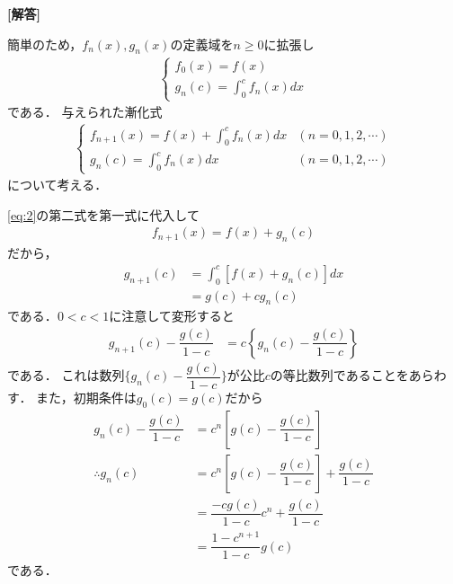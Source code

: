 \documentclass[../../main.tex]{subfiles}
\begin{document}
\begin{oframed}
  
\end{oframed}

{\bf [解答]}

簡単のため，$f_n(x),g_n(x)$の定義域を$n\ge 0$に拡張し
\begin{align}
  \begin{cases}
    f_{0}(x) = f(x) \\
    g_{n}(c) = \int_{0}^{c} f_n(x) dx
  \end{cases} \label{eq:1}
\end{align}
である．
与えられた漸化式
\begin{align}
  \begin{cases}
    f_{n+1}(x) = f(x) + \int_{0}^{c} f_{n}(x) dx & \left(n=0,1,2,\cdots \right)\\
    g_{n}(c) = \int_{0}^{c} f_{n}(x) dx & \left(n=0,1,2,\cdots \right)
  \end{cases} \label{eq:2}
\end{align}
について考える．

\cref{eq:2}の第二式を第一式に代入して
\begin{align}
  f_{n+1}(x) = f(x) + g_{n}(c) \label{eq:3}
\end{align}
だから，
\begin{align}
  g_{n+1}(c)
  & = \int_{0}^{c} \left[f(x) + g_{n}(c)\right] dx \\
  & = g(c) + cg_{n}(c)
\end{align}
である．$0<c<1$に注意して変形すると
\begin{align}
  g_{n+1}(c)-\dfrac{g(c)}{1-c}&=c\left\{ g_{n}(c)-\dfrac{g(c)}{1-c}\right\} \label{eq:4}
\end{align}
である．
これは数列$\{ g_n(c)-\dfrac{g(c)}{1-c}\}$が公比$c$の等比数列であることをあらわす．
また，初期条件は$g_{0}(c)=g(c)$だから
\begin{align}
  g_n(c)-\dfrac{g(c)}{1-c} &= c^{n}\left[g(c)-\dfrac{g(c)}{1-c}\right] \\
  \therefore
  g_n(c)
  &= c^{n}\left[g(c)-\dfrac{g(c)}{1-c}\right] + \dfrac{g(c)}{1-c} \\
  &= \dfrac{-cg(c)}{1-c}c^{n} + \dfrac{g(c)}{1-c} \\
  &= \dfrac{1-c^{n+1}}{1-c}g(c) \label{eq:5}
\end{align}
である．
\end{document}
